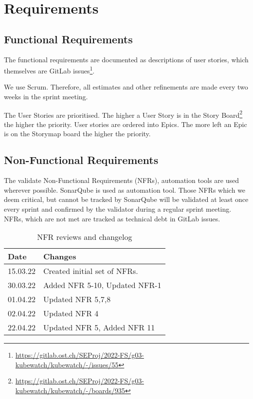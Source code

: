 \chapter{Requirements}

\section{Functional Requirements}
\label{section:functional-requirements}
The functional requirements are documented as descriptions of user stories, which themselves are GitLab issues\footnote{\url{https://gitlab.ost.ch/SEProj/2022-FS/g03-kubewatch/kubewatch/-/issues/55}}.

We use Scrum.
Therefore, all estimates and other refinements are made every two weeks in the sprint meeting.

The User Stories are prioritised.
The higher a User Story is in the Story Board\footnote{\url{https://gitlab.ost.ch/SEProj/2022-FS/g03-kubewatch/kubewatch/-/boards/935}} the higher the priority.
User stories are ordered into Epics. The more left an Epic is on the Storymap board the higher the priority.

\section{Non-Functional Requirements}
\label{section:non-functional-requirements}
The validate Non-Functional Requirements (NFRs), automation tools are used wherever possible. SonarQube is used as automation tool. Those NFRs which we deem critical, but cannot be tracked by SonarQube will be validated at least once every sprint and confirmed by the validator during a regular sprint meeting. NFRs, which are not met are tracked as technical debt in GitLab issues.

\begin{table}[h!]
    \centering
      \caption{\label{tab:nfr-review}NFR reviews and changelog}
      \begin{tabular}{ | l | l | }
        \hline
        \textbf{Date} & \textbf{Changes} \\
        \hline
        15.03.22 & Created initial set of NFRs. \\
        \hline
        30.03.22 & Added NFR 5-10, Updated NFR-1 \\
        \hline
        01.04.22 & Updated NFR 5,7,8 \\
        \hline
        02.04.22 & Updated NFR 4 \\
        \hline
        22.04.22 & Updated NFR 5, Added NFR 11 \\
        \hline
      \end{tabular}
    \end{table}


